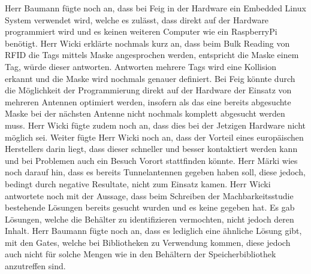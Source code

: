 \documentclass[parskip=full, a4paper]{scrreprt}
\begin{document}
Herr Baumann fügte noch an, dass bei Feig in der Hardware ein Embedded Linux System verwendet wird, welche es zulässt, dass direkt auf der Hardware programmiert wird und es keinen weiteren Computer wie ein RaspberryPi benötigt. Herr Wicki erklärte nochmals kurz an, dass beim Bulk Reading von RFID die Tags mittels Maske angesprochen werden, entspricht die Maske einem Tag, würde dieser antworten. Antworten mehrere Tags wird eine Kollision erkannt und die Maske wird nochmals genauer definiert. Bei Feig könnte durch die Möglichkeit der Programmierung direkt auf der Hardware der Einsatz von mehreren Antennen optimiert werden, insofern als das eine bereits abgesuchte Maske bei der nächsten Antenne nicht nochmals komplett abgesucht werden muss. Herr Wicki fügte zudem noch an, dass dies bei der Jetzigen Hardware nicht möglich sei.
Weiter fügte Herr Wicki noch an, dass der Vorteil eines europäischen Herstellers darin liegt, dass dieser schneller und besser kontaktiert werden kann und bei Problemen auch ein Besuch Vorort stattfinden könnte.
Herr Märki wies noch darauf hin, dass es bereits Tunnelantennen gegeben haben soll, diese jedoch, bedingt durch negative Resultate, nicht zum Einsatz kamen.
Herr Wicki antwortete noch mit der Aussage, dass beim Schreiben der Machbarkeitsstudie bestehende Lösungen bereits gesucht wurden und es keine gegeben hat. Es gab Lösungen, welche die Behälter zu identifizieren vermochten, nicht jedoch deren Inhalt. Herr Baumann fügte noch an, dass es lediglich eine ähnliche Lösung gibt, mit den Gates, welche bei Bibliotheken zu Verwendung kommen, diese jedoch auch nicht für solche Mengen wie in den Behältern der Speicherbibliothek anzutreffen sind.
\end{document}
